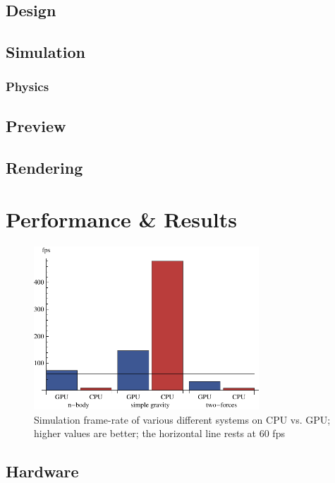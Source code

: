 \documentclass{acmsiggraph}
\begin{document}
\subsection{Design}

\subsection{Simulation}

\subsubsection{Physics}

\subsection{Preview}

\subsection{Rendering}

\section{Performance \& Results}

\label{performanceSection}

\begin{figure}
    \includegraphics[width=84.5mm]{basicSpeedPlot.pdf}
    \caption{Simulation frame-rate of various different systems on CPU vs. GPU; higher values are better; the horizontal line rests at 60 fps}
    \label{fig:basicSpeedPlot}
\end{figure}

\subsection{Hardware}
\end{document}
